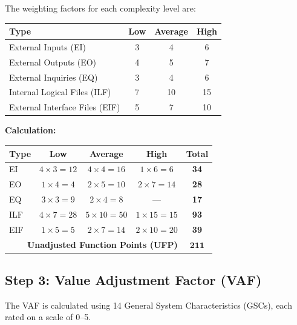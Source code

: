 \documentclass[12pt,a4paper]{article}
\begin{document}
The weighting factors for each complexity level are:

\begin{center}
\begin{tabular}{lccc}
\toprule
\textbf{Type} & \textbf{Low} & \textbf{Average} & \textbf{High} \\
\midrule
External Inputs (EI) & 3 & 4 & 6 \\
External Outputs (EO) & 4 & 5 & 7 \\
External Inquiries (EQ) & 3 & 4 & 6 \\
Internal Logical Files (ILF) & 7 & 10 & 15 \\
External Interface Files (EIF) & 5 & 7 & 10 \\
\bottomrule
\end{tabular}
\end{center}

\bigskip
\noindent\textbf{Calculation:}

\begin{center}
\begin{tabular}{l c c c c}
\toprule
\textbf{Type} & \textbf{Low} & \textbf{Average} & \textbf{High} & \textbf{Total} \\
\midrule
EI & $4 \times 3 = 12$ & $4 \times 4 = 16$ & $1 \times 6 = 6$ & \textbf{34} \\
EO & $1 \times 4 = 4$ & $2 \times 5 = 10$ & $2 \times 7 = 14$ & \textbf{28} \\
EQ & $3 \times 3 = 9$ & $2 \times 4 = 8$ & --- & \textbf{17} \\
ILF & $4 \times 7 = 28$ & $5 \times 10 = 50$ & $1 \times 15 = 15$ & \textbf{93} \\
EIF & $1 \times 5 = 5$ & $2 \times 7 = 14$ & $2 \times 10 = 20$ & \textbf{39} \\
\midrule
\multicolumn{4}{r}{\textbf{Unadjusted Function Points (UFP)}} & $\mathbf{211}$ \\
\bottomrule
\end{tabular}
\end{center}

\subsection{Step 3: Value Adjustment Factor (VAF)}

The VAF is calculated using 14 General System Characteristics (GSCs), each rated on a scale of 0--5.
\end{document}

